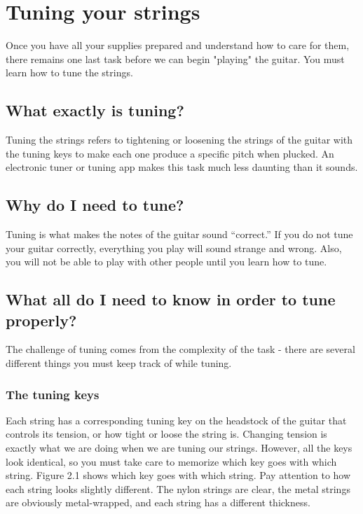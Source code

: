 \chapter[How to Tune]{Tuning your strings}

Once you have all your supplies prepared and understand how to care for them, there remains one last task before we can begin "playing" the guitar. You must learn how to tune the strings.

\section{What exactly is tuning?}

Tuning the strings refers to tightening or loosening the strings of the guitar with the tuning keys to make each one produce a specific pitch when plucked. An electronic tuner or tuning app makes this task much less daunting than it sounds.

\section{Why do I need to tune?}

Tuning is what makes the notes of the guitar sound ``correct.'' If you do not tune your guitar correctly, everything you play will sound strange and wrong. Also, you will not be able to play with other people until you learn how to tune.

\section[Proper tuning]{What all do I need to know in order to tune properly?}

The challenge of tuning comes from the complexity of the task - there are several different things you must keep track of while tuning.

\subsection{The tuning keys}

Each string has a corresponding tuning key on the headstock of the guitar that controls its tension, or how tight or loose the string is. Changing tension is exactly what we are doing when we are tuning our strings. However, all the keys look identical, so you must take care to memorize which key goes with which string. Figure 2.1 shows which key goes with which string. Pay attention to how each string looks slightly different. The nylon strings are clear, the metal strings are obviously metal-wrapped, and each string has a different thickness.

